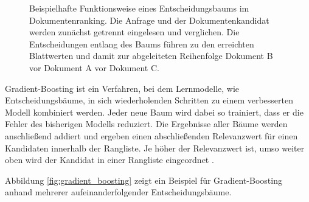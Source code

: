 \begin{figure}[H]
    \caption{ Beispielhafte Funktionsweise eines Entscheidungsbaums im Dokumentenranking. Die Anfrage und der Dokumentenkandidat werden zunächst getrennt eingelesen und verglichen.
Die Entscheidungen entlang des Baums führen zu den erreichten Blattwerten und damit zur abgeleiteten Reihenfolge Dokument B vor Dokument A vor Dokument C. } 
\label{fig:entscheidungsbaum} 
\end{figure}


Gradient-Boosting ist ein Verfahren, bei dem Lernmodelle, wie Entscheidungsbäume, in sich wiederholenden Schritten zu einem verbesserten Modell kombiniert werden. Jeder neue Baum wird dabei so trainiert, dass er die Fehler des bisherigen Modells reduziert. 
Die Ergebnisse aller Bäume werden anschließend addiert und ergeben einen abschließenden Relevanzwert für einen Kandidaten innerhalb der Rangliste. Je höher der Relevanzwert ist, umso weiter oben wird der Kandidat in einer Rangliste eingeordnet \parencite{burges2010lambdamart,ke2017lightgbm}.

Abbildung \ref{fig:gradient_boosting} zeigt ein Beispiel für Gradient-Boosting anhand mehrerer aufeinanderfolgender Entscheidungsbäume.

